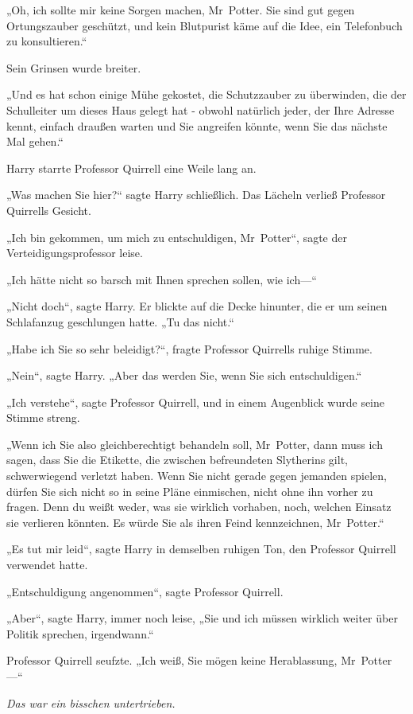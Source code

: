 {„Oh, ich sollte mir keine Sorgen machen, Mr~Potter. Sie sind gut gegen Ortungszauber geschützt, und kein Blutpurist käme auf die Idee, ein Telefonbuch zu konsultieren.“

Sein Grinsen wurde breiter.

„Und es hat schon einige Mühe gekostet, die Schutzzauber zu überwinden, die der Schulleiter um dieses Haus gelegt hat - obwohl natürlich jeder, der Ihre Adresse kennt, einfach draußen warten und Sie angreifen könnte, wenn Sie das nächste Mal gehen.“

Harry starrte Professor Quirrell eine Weile lang an.

„Was machen Sie hier?“ sagte Harry schließlich. Das Lächeln verließ Professor Quirrells Gesicht.

„Ich bin gekommen, um mich zu entschuldigen, Mr~Potter“, sagte der Verteidigungsprofessor leise.

„Ich hätte nicht so barsch mit Ihnen sprechen sollen, wie ich—“

„Nicht doch“, sagte Harry. Er blickte auf die Decke hinunter, die er um seinen Schlafanzug geschlungen hatte. „Tu das nicht.“

„Habe ich Sie so sehr beleidigt?“, fragte Professor Quirrells ruhige Stimme.

„Nein“, sagte Harry. „Aber das werden Sie, wenn Sie sich entschuldigen.“

„Ich verstehe“, sagte Professor Quirrell, und in einem Augenblick wurde seine Stimme streng.

„Wenn ich Sie also gleichberechtigt behandeln soll, Mr~Potter, dann muss ich sagen, dass Sie die Etikette, die zwischen befreundeten Slytherins gilt, schwerwiegend verletzt haben. Wenn Sie nicht gerade gegen jemanden spielen, dürfen Sie sich nicht so in seine Pläne einmischen, nicht ohne ihn vorher zu fragen. Denn du weißt weder, was sie wirklich vorhaben, noch, welchen Einsatz sie verlieren könnten. Es würde Sie als ihren Feind kennzeichnen, Mr~Potter.“

„Es tut mir leid“, sagte Harry in demselben ruhigen Ton, den Professor Quirrell verwendet hatte.

„Entschuldigung angenommen“, sagte Professor Quirrell.

„Aber“, sagte Harry, immer noch leise, „Sie und ich müssen wirklich weiter über Politik sprechen, irgendwann.“

Professor Quirrell seufzte. „Ich weiß, Sie mögen keine Herablassung, Mr~Potter—“

\emph{Das war ein bisschen untertrieben.}

}
